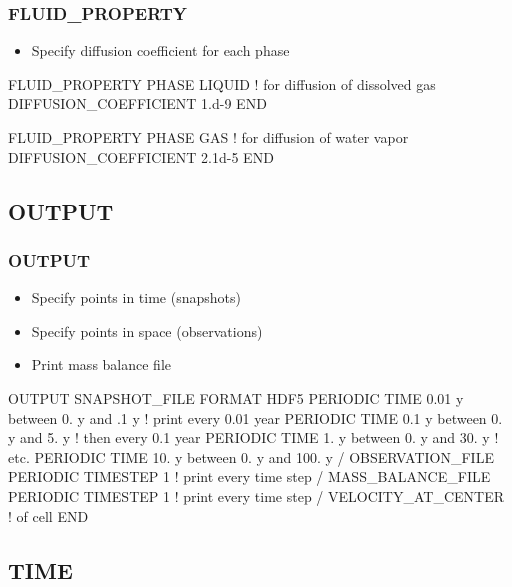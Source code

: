 \documentclass{beamer}
\newcommand\bluecomment[1]{{{\color{blue} #1}}}
\begin{document}
\begin{frame}[fragile]\frametitle{FLUID_PROPERTY}
\begin{itemize}
  \item Specify diffusion coefficient for each phase
\end{itemize}

\begin{semiverbatim}

FLUID_PROPERTY
  PHASE LIQUID \bluecomment{! for diffusion of dissolved gas}
  DIFFUSION_COEFFICIENT 1.d-9
END

FLUID_PROPERTY
  PHASE GAS \bluecomment{! for diffusion of water vapor}
  DIFFUSION_COEFFICIENT 2.1d-5
END
\end{semiverbatim}

\end{frame}

\subsection{OUTPUT}

\begin{frame}[fragile]\frametitle{OUTPUT}
\begin{itemize}
  \item Specify points in time (snapshots)
  \item Specify points in space (observations)
  \item Print mass balance file
\end{itemize}

\begin{semiverbatim}

OUTPUT
  SNAPSHOT_FILE
    FORMAT HDF5
    PERIODIC TIME 0.01 y between 0. y and .1 y \bluecomment{! print every 0.01 year}
    PERIODIC TIME 0.1 y between 0. y and 5. y  \bluecomment{! then every 0.1 year}
    PERIODIC TIME 1. y between 0. y and 30. y  \bluecomment{! etc.}
    PERIODIC TIME 10. y between 0. y and 100. y
  /
  OBSERVATION_FILE
    PERIODIC TIMESTEP 1 \bluecomment{! print every time step}
  /
  MASS_BALANCE_FILE
    PERIODIC TIMESTEP 1 \bluecomment{! print every time step}
  /
  VELOCITY_AT_CENTER \bluecomment{! of cell}
END
\end{semiverbatim}

\end{frame}

\subsection{TIME}
\end{document}
